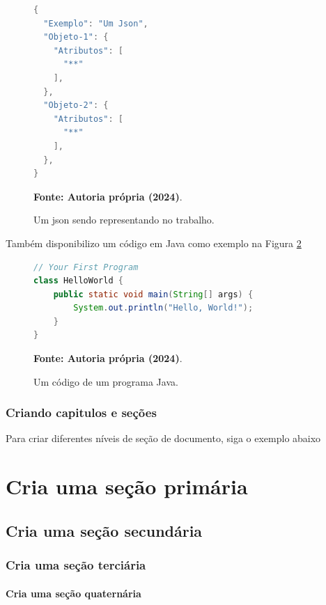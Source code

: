 \begin{figure}[ht]
\caption{Um json sendo representando no trabalho.}
\centering
\begin{lstlisting}[frame=single, language=Java, breaklines=true]
{
  "Exemplo": "Um Json",
  "Objeto-1": {
    "Atributos": [
      "**"
    ],
  },
  "Objeto-2": {
    "Atributos": [
      "**"
    ],
  },
}
\end{lstlisting}
\vspace{0.5\baselineskip} 
\footnotesize \textbf{Fonte: Autoria própria (2024)}.
\label{fig:codigo-como-figura}
\end{figure}
\FloatBarrier

Também disponibilizo um código em Java como exemplo na Figura \ref{fig:codigo-java}
\begin{figure}[ht]
\caption{Um código de um programa Java.}
\centering
\begin{lstlisting}[frame=single, language=Java, breaklines=true]
// Your First Program
class HelloWorld {
    public static void main(String[] args) {
        System.out.println("Hello, World!"); 
    }
}
\end{lstlisting}
\vspace{0.5\baselineskip} 
\footnotesize \textbf{Fonte: Autoria própria (2024)}.
\label{fig:codigo-java}
\end{figure}
\FloatBarrier

\subsection{Criando capitulos e seções}

Para criar diferentes níveis de seção de documento, siga o exemplo abaixo

\chapter{Cria uma seção primária}\label{chp:EXEMPLO}

\section{Cria uma seção secundária}

\subsection{Cria uma seção terciária}

\subsubsection{Cria uma seção quaternária}
